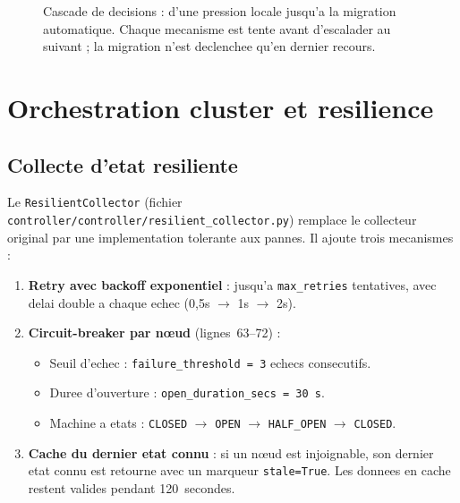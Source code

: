 \begin{figure}[htbp]
    \caption{Cascade de decisions : d'une pression locale jusqu'a la migration automatique. Chaque mecanisme est tente avant d'escalader au suivant ; la migration n'est declenchee qu'en dernier recours.}
    \label{fig:migration-cascade}
\end{figure}

\section{Orchestration cluster et resilience}
\label{sec:orchestration}

\subsection{Collecte d'etat resiliente}
\label{subsec:collecte-resiliente}

Le \texttt{ResilientCollector} (fichier \texttt{controller/controller/resilient\_collector.py}) remplace le collecteur original par une implementation tolerante aux pannes. Il ajoute trois mecanismes :

\begin{enumerate}
    \item \textbf{Retry avec backoff exponentiel} : jusqu'a \texttt{max\_retries} tentatives, avec delai double a chaque echec (0,5s $\to$ 1s $\to$ 2s).

    \item \textbf{Circuit-breaker par n\oe{}ud} (lignes~63--72) :
    \begin{itemize}
        \item Seuil d'echec : \texttt{failure\_threshold = 3} echecs consecutifs.
        \item Duree d'ouverture : \texttt{open\_duration\_secs = 30~s}.
        \item Machine a etats : \texttt{CLOSED} $\to$ \texttt{OPEN} $\to$ \texttt{HALF\_OPEN} $\to$ \texttt{CLOSED}.
    \end{itemize}

    \item \textbf{Cache du dernier etat connu} : si un n\oe{}ud est injoignable, son dernier etat connu est retourne avec un marqueur \texttt{stale=True}. Les donnees en cache restent valides pendant 120~secondes.
\end{enumerate}

